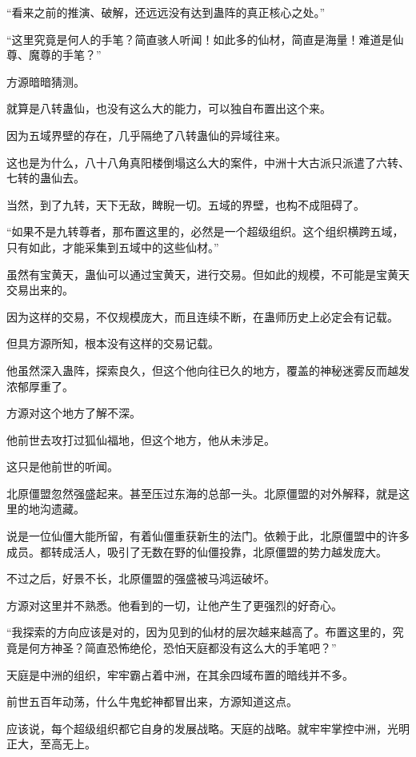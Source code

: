 \begin{this_body}
“看来之前的推演、破解，还远远没有达到蛊阵的真正核心之处。”

“这里究竟是何人的手笔？简直骇人听闻！如此多的仙材，简直是海量！难道是仙尊、魔尊的手笔？”

方源暗暗猜测。

就算是八转蛊仙，也没有这么大的能力，可以独自布置出这个来。

因为五域界壁的存在，几乎隔绝了八转蛊仙的异域往来。

这也是为什么，八十八角真阳楼倒塌这么大的案件，中洲十大古派只派遣了六转、七转的蛊仙去。

当然，到了九转，天下无敌，睥睨一切。五域的界壁，也构不成阻碍了。

“如果不是九转尊者，那布置这里的，必然是一个超级组织。这个组织横跨五域，只有如此，才能采集到五域中的这些仙材。”

虽然有宝黄天，蛊仙可以通过宝黄天，进行交易。但如此的规模，不可能是宝黄天交易出来的。

因为这样的交易，不仅规模庞大，而且连续不断，在蛊师历史上必定会有记载。

但具方源所知，根本没有这样的交易记载。

他虽然深入蛊阵，探索良久，但这个他向往已久的地方，覆盖的神秘迷雾反而越发浓郁厚重了。

方源对这个地方了解不深。

他前世去攻打过狐仙福地，但这个地方，他从未涉足。

这只是他前世的听闻。

北原僵盟忽然强盛起来。甚至压过东海的总部一头。北原僵盟的对外解释，就是这里的地沟遗藏。

说是一位仙僵大能所留，有着仙僵重获新生的法门。依赖于此，北原僵盟中的许多成员。都转成活人，吸引了无数在野的仙僵投靠，北原僵盟的势力越发庞大。

不过之后，好景不长，北原僵盟的强盛被马鸿运破坏。

方源对这里并不熟悉。他看到的一切，让他产生了更强烈的好奇心。

“我探索的方向应该是对的，因为见到的仙材的层次越来越高了。布置这里的，究竟是何方神圣？简直恐怖绝伦，恐怕天庭都没有这么大的手笔吧？”

天庭是中洲的组织，牢牢霸占着中洲，在其余四域布置的暗线并不多。

前世五百年动荡，什么牛鬼蛇神都冒出来，方源知道这点。

应该说，每个超级组织都它自身的发展战略。天庭的战略。就牢牢掌控中洲，光明正大，至高无上。


\end{this_body}

